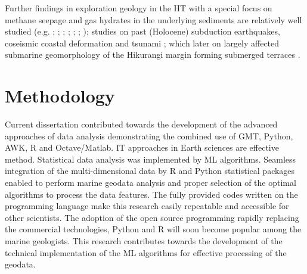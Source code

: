 \documentclass[11pt,a4paper]{report}
\begin{document}
{Further findings in exploration geology in the \ac{HT} with a special focus on methane seepage and gas hydrates in the underlying sediments are relatively well studied (e.g. \cite{Greinert}; \cite{Wangetal2017}; \cite{Klauckeetal2010}; \cite{Pecheretal2010}; \cite{Krabbenhoeft2013}; \cite{Krabbenhoeft2010}; \cite{Martinetal2010}); studies on past (Holocene) subduction earthquakes, coseismic coastal deformation and tsunami \cite{Clarketal2019}; \cite{Berrymanetal2011} which later on largely affected submarine geomorphology of the Hikurangi margin forming submerged terraces \cite{Berryman1993}. 

\pagebreak
\chapter{Methodology}\label{chp:3}

Current dissertation contributed towards the development of the advanced approaches of data analysis demonstrating the combined use of \ac{GMT}, Python, AWK, R and Octave/Matlab. \ac{IT} approaches in Earth sciences are effective method. Statistical data analysis was implemented by \ac{ML} algorithms. Seamless integration of the multi-dimensional data by R and Python statistical packages enabled to perform marine geodata analysis and proper selection of the optimal algorithms to process the data features. The fully provided codes written on the programming language make this research easily repeatable and accessible for other scientists. The adoption of the open source programming rapidly replacing the commercial technologies, Python and R will soon become popular among the marine geologists. This research contributes towards the development of the technical implementation of the \ac{ML} algorithms for effective processing of the geodata. 	

}
\end{document}
